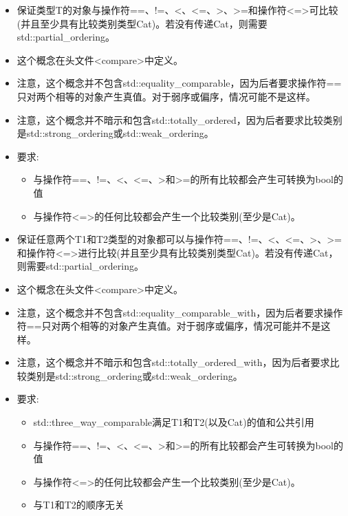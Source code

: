 

\begin{itemize}
\item
保证类型T的对象与操作符==、!=、<、<=、>、>=和操作符<=>可比较(并且至少具有比较类别类型Cat)。若没有传递Cat，则需要std::partial\_ordering。

\item
这个概念在头文件<compare>中定义。

\item
注意，这个概念并不包含std::equality\_comparable，因为后者要求操作符==只对两个相等的对象产生真值。对于弱序或偏序，情况可能不是这样。

\item
注意，这个概念并不暗示和包含std::totally\_ordered，因为后者要求比较类别是std::strong\_ordering或std::weak\_ordering。

\item
要求:
\begin{itemize}
\item
与操作符==、!=、<、<=、>和>=的所有比较都会产生可转换为bool的值

\item
与操作符<=>的任何比较都会产生一个比较类别(至少是Cat)。
\end{itemize}
\end{itemize}


\begin{itemize}
\item
保证任意两个T1和T2类型的对象都可以与操作符==、!=、<、<=、>、>=和操作符<=>进行比较(并且至少具有比较类别类型Cat)。若没有传递Cat，则需要std::partial\_ordering。

\item
这个概念在头文件<compare>中定义。

\item
注意，这个概念并不包含std::equality\_comparable\_with，因为后者要求操作符==只对两个相等的对象产生真值。对于弱序或偏序，情况可能并不是这样。

\item
注意，这个概念并不暗示和包含std::totally\_ordered\_with，因为后者要求比较类别是std::strong\_ordering或std::weak\_ordering。

\item
要求:
\begin{itemize}
\item
std::three\_way\_comparable满足T1和T2(以及Cat)的值和公共引用

\item
与操作符==、!=、<、<=、>和>=的所有比较都会产生可转换为bool的值

\item
与操作符<=>的任何比较都会产生一个比较类别(至少是Cat)。

\item
与T1和T2的顺序无关
\end{itemize}
\end{itemize}




